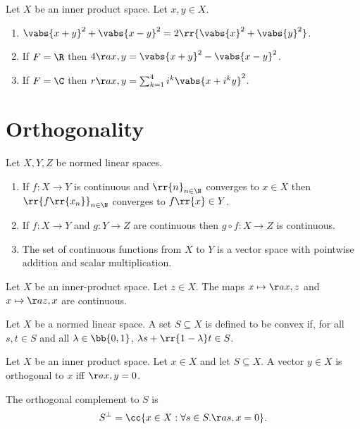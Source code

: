 \documentclass{article}
\begin{document}
\begin{theorem}
  Let $X$ be an inner product space. Let $x,y\in X$.
  \begin{enumerate}
    \item $\vabs{x+y}^2+\vabs{x-y}^2= 2\rr{\vabs{x}^2+\vabs{y}^2}$.
    \item If $F=\R$ then $4\aa{x,y}=\vabs{x+y}^2 - \vabs{x-y}^2$.
    \item If $F=\C$ then $r\aa{x,y}=\sum_{k=1}^4 i^k \vabs{x+i^ky}^2$.
  \end{enumerate}
\end{theorem}

\section{Orthogonality}\label{sec:orthogonality}

\begin{lemma}
  Let $X,Y,Z$ be normed linear spaces.
  \begin{enumerate}
    \item If $f:X\to Y$ is continuous and $\rr{n}_{n\in\N}$ converges to $x\in X$ then $\rr{f\rr{x_n}}_{n\in\N}$
      converges to $f\rr{x}\in Y$.
    \item If $f:X\to Y$ and $g:Y\to Z$ are continuous then $g\circ f:X\to Z$ is continuous.
    \item The set of continuous functions from $X$ to $Y$ is a vector space with pointwise
      addition and scalar multiplication.
  \end{enumerate}
\end{lemma}

\begin{lemma}
  Let $X$ be an inner-product space. Let $z\in X$. The maps $x\mapsto\aa{x,z}$ and
  $x\mapsto\aa{z,x}$ are continuous.
\end{lemma}

\begin{definition}\label{def:convex-set}
  Let $X$ be a normed linear space. A set $S\subseteq X$ is defined to be convex if, for all
  $s,t\in S$ and all $\lambda\in\bb{0,1}$, $\lambda s + \rr{1-\lambda}t\in S$.
\end{definition}

\begin{definition}\label{def:orthogonality}
  Let $X$ be an inner product space. Let $x\in X$ and let $S\subseteq X$. A vector $y\in X$
  is orthogonal to $x$ iff $\aa{x,y}=0$.

  The orthogonal complement to $S$ is
  \begin{align*}
    S^\bot = \cc{x\in X : \forall s\in S. \aa{s,x}=0}.
  \end{align*}
\end{definition}
\end{document}
